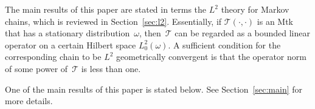 \documentclass[12pt]{article}
\newcommand{\df}{\mathrm{d}}
\newcommand{\Z}{\mathsf{Z}}
\newcommand{\Mtk}{\mtkfont{T}}
\newcommand{\mtkfont}{\mathcal}
\begin{document}



The main results of this paper are stated in terms the $L^2$ theory for Markov chains, which is reviewed in Section~\ref{sec:l2}.
Essentially, if $\Mtk(\cdot,\cdot)$ is an Mtk that has a stationary distribution~$\omega$, then~$\Mtk$ can be regarded as a bounded linear operator on a certain Hilbert space $L_0^2(\omega)$.
A sufficient condition for the corresponding chain to be $L^2$ geometrically convergent is that the operator norm of some power of~$\Mtk$ is less than one.

One of the main results of this paper is stated below.
See Section~\ref{sec:main} for more details.
\end{document}
